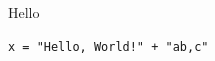 \documentclass{article}
\begin{document}
Hello
\begin{lstlisting}
x = "Hello, World!" + "ab,c"
\end{lstlisting}
\end{document}
